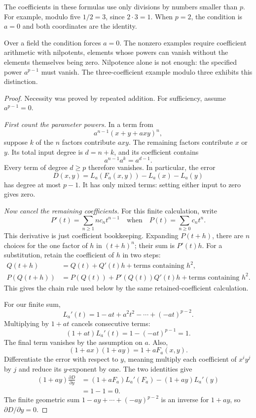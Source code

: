 \documentclass[11pt,letterpaper]{article}
\numberwithin{equation}{section}
\theoremstyle{definition}\newtheorem{example}[theorem]{Example}
\begin{document}
The coefficients in these formulas use only divisions by numbers smaller than \(p\). For example, modulo five \(1/2=3\), since \(2\cdot3=1\). When \(p=2\), the condition is \(a=0\) and both coordinates are the identity.

Over a field the condition forces \(a=0\). The nonzero examples require coefficient arithmetic with nilpotents, elements whose powers can vanish without the elements themselves being zero. Nilpotence alone is not enough: the specified power \(a^{p-1}\) must vanish. The three-coefficient example modulo three exhibits this distinction.

\begin{proof}
Necessity was proved by repeated addition. For sufficiency, assume \(a^{p-1}=0\).

\emph{First count the parameter powers.} In a term from
\[
 a^{n-1}(x+y+a xy)^n,
\]
suppose \(k\) of the \(n\) factors contribute \(a xy\). The remaining factors contribute \(x\) or \(y\). Its total input degree is \(d=n+k\), and its coefficient contains
\[
 a^{n-1}a^k=a^{d-1}.
\]
Every term of degree \(d\ge p\) therefore vanishes. In particular, the error
\[
 D(x,y)=L_a(F_a(x,y))-L_a(x)-L_a(y)
\]
has degree at most \(p-1\). It has only mixed terms: setting either input to zero gives zero.

\emph{Now cancel the remaining coefficients.} For this finite calculation, write
\[
 P'(t)=\sum_{n\ge1}n c_nt^{n-1}
 \quad\text{when}\quad P(t)=\sum_{n\ge0}c_nt^n.
\]
This derivative is just coefficient bookkeeping. Expanding \(P(t+h)\), there are \(n\) choices for the one factor of \(h\) in \((t+h)^n\); their sum is \(P'(t)h\). For a substitution, retain the coefficient of \(h\) in two steps:
\begin{align*}
 Q(t+h)&=Q(t)+Q'(t)h+\text{terms containing }h^2,\\
 P(Q(t+h))&=P(Q(t))+P'(Q(t))Q'(t)h
 +\text{terms containing }h^2.
\end{align*}
This gives the chain rule used below by the same retained-coefficient calculation.

For our finite sum,
\[
 L_a'(t)=1-at+a^2t^2-\cdots+(-at)^{p-2}.
\]
Multiplying by \(1+at\) cancels consecutive terms:
\begin{equation}\label{eq:finite-geometric}
 (1+at)L_a'(t)=1-(-at)^{p-1}=1.
\end{equation}
The final term vanishes by the assumption on \(a\). Also,
\[
 (1+ax)(1+ay)=1+aF_a(x,y).
\]
Differentiate the error with respect to \(y\), meaning multiply each coefficient of \(x^iy^j\) by \(j\) and reduce its \(y\)-exponent by one. The two identities give
\begin{align*}
 (1+ay)\frac{\partial D}{\partial y}
 &=(1+aF_a)L_a'(F_a)-(1+ay)L_a'(y)\\
 &=1-1=0.
\end{align*}
The finite geometric sum \(1-ay+\cdots+(-ay)^{p-2}\) is an inverse for \(1+ay\), so \(\partial D/\partial y=0\).


\end{proof}
\end{document}
